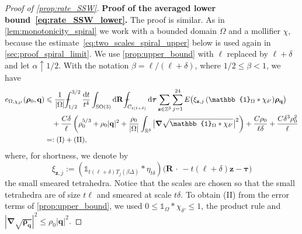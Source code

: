 \documentclass[final,reqno]{amsart}
\theoremstyle{remark}
\renewcommand{\le}{\leqslant}
\newcommand{\RR}{\mathbb{R}}
\newcommand{\ZZ}{\mathbb{Z}}
\newcommand{\SO}{\mathrm{SO}}
\newcommand{\iden}{\mathbb{1}}
\newcommand{\grad}{\bm{\nabla}}
\newcommand{\tetra}{\mathbb{\Delta}}
\newcommand{\dd}{\mathrm{d}}
\def\Xint#1{\mathchoice
{\XXint\displaystyle\textstyle{#1}}
{\XXint\textstyle\scriptstyle{#1}}
{\XXint\scriptstyle\scriptscriptstyle{#1}}
{\XXint\scriptscriptstyle\scriptscriptstyle{#1}}
\!\int}
\def\XXint#1#2#3{{\setbox0=\hbox{$#1{#2#3}{\int}$ }
\vcenter{\hbox{$#2#3$ }}\kern-.6\wd0}}
\def\dashint{\Xint-}
\begin{document}
\begin{proof}[Proof of \cref{prop:rate_SSW}]
\noindent\textbf{Proof of the averaged lower bound~\cref{eq:rate_SSW_lower}.} The proof is similar. As in \cref{lem:monotonicity_spiral} we work with a bounded domain $\Omega$ and a mollifier $\chi$, because the estimate~\cref{eq:two_scales_spiral_upper} below is used again in \cref{sec:proof_spiral_limit}. We use \cref{prop:upper_bound} with $\ell$ replaced by $\ell+\delta$ and let $\alpha\uparrow1/2$. With the notation $\beta=\ell/(\ell+\delta)$, where $1/2\le\beta<1$, we have
\begin{equation*}
\begin{aligned}
 e_{\Omega,\chi_{\delta'}}(\bm{\rho}_0,\mathbf{q})
 &\le\frac{1}{|\Omega|}\dashint_{1/2}^{3/2}\frac{\dd t}{t^4}\int_{\SO(3)}\dd\mathbf{R}\,\dashint_{C_{t(\ell+\delta)}}\dd\bm{\tau}
 \sum_{\mathbf{z}\in\ZZ^3}\sum_{j=1}^{24}E\big(\xi_{\mathbf{z},j}\,(\iden_\Omega\ast\chi_{\delta'})\bm{\rho}_{\mathbf{q}}\big)\\
 &\quad+\frac{C\delta}{\ell}\left(\rho_0^{5/3}+\rho_0|\mathbf{q}|^2
 +\frac{\rho_0}{|\Omega|}\int_{\RR^3}\big|\grad\sqrt{\iden_\Omega\ast\chi_{\delta'}}\big|^2\right)
 +\frac{C\rho_0}{\ell\delta}+\frac{C\delta^3\rho_0^2}{\ell}\\
 &=:\mathrm{(I)}+\mathrm{(II)},
\end{aligned}
\end{equation*}
where, for shortness, we denote by
\[
 \xi_{\mathbf{z},j}:=(\iden_{t(\ell+\delta)T_j(\beta\tetra)}\ast\eta_{t\delta})\big(\mathbf{R}\,\cdot\,-t(\ell+\delta)\mathbf{z}-\bm{\tau}\big)
\]
the small smeared tetrahedra. Notice that the scales are chosen so that the small tetrahedra are of size $t\ell$ and smeared at scale $t\delta$. To obtain (II) from the error terms of \cref{prop:upper_bound}, we used $0\le\iden_\Omega\ast\chi_{\delta'}\le1$, the product rule and $|\grad\sqrt{\bm{\rho}_{\mathbf{q}}}|^2\le\rho_0|\mathbf{q}|^2$.


\end{proof}
\end{document}
